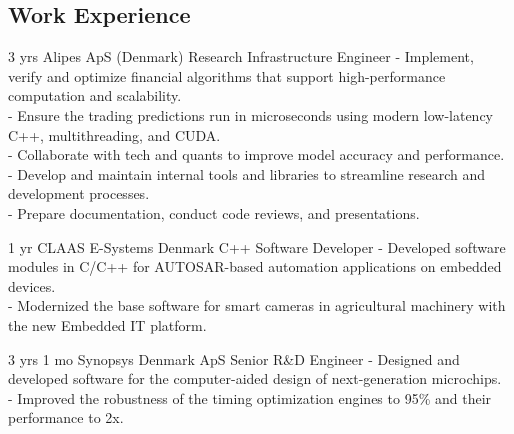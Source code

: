 \documentclass[11pt]{article} %
\begin{document}
\begin{paracol}{2}
\switchcolumn

\section{Work Experience}




{3 yrs} %
{Alipes ApS (Denmark)} %
{Research Infrastructure Engineer} %
{- Implement, verify and optimize financial algorithms that support high-performance computation and scalability. \\
 - Ensure the trading predictions run in microseconds using modern low-latency C++, multithreading, and CUDA. \\
 - Collaborate with tech and quants to improve model accuracy and performance. \\
 - Develop and maintain internal tools and libraries to streamline research and development processes. \\
 - Prepare documentation, conduct code reviews, and presentations.
} %

{1 yr} %
{CLAAS E-Systems Denmark} %
{C++ Software Developer} %
{- Developed software modules in C/C++ for AUTOSAR-based automation applications on embedded devices. \\
- Modernized the base software for smart cameras in agricultural machinery with the new Embedded IT platform.
} %


{3 yrs 1 mo} %
{Synopsys Denmark ApS} %
{Senior R\&D Engineer} %
{- Designed and developed software for the computer-aided design of next-generation microchips. \\
- Improved the robustness of the timing optimization engines to 95\% and their performance to 2x.
} %


\end{paracol}
\end{document}
